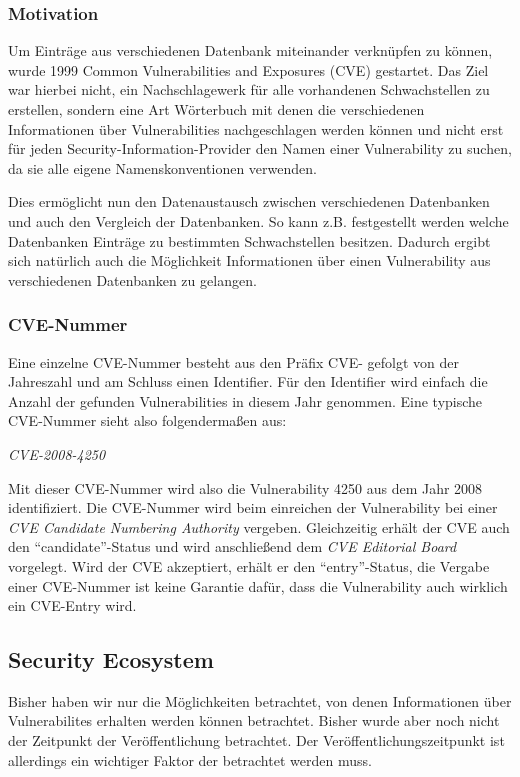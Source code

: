 \subsubsection{Motivation} Um Einträge aus verschiedenen Datenbank
miteinander verknüpfen zu können, wurde 1999 Common Vulnerabilities
and Exposures (CVE) gestartet. Das Ziel war hierbei nicht, ein
Nachschlagewerk für alle vorhandenen Schwachstellen zu erstellen,
sondern eine Art Wörterbuch mit denen die verschiedenen Informationen
über Vulnerabilities nachgeschlagen werden können und nicht erst für
jeden Security-Information-Provider den Namen einer Vulnerability zu
suchen, da sie alle eigene Namenskonventionen verwenden.

Dies ermöglicht nun den Datenaustausch zwischen verschiedenen
Datenbanken und auch den Vergleich der Datenbanken. So kann
z.B. festgestellt werden welche Datenbanken Einträge zu bestimmten
Schwachstellen besitzen. Dadurch ergibt sich natürlich auch die
Möglichkeit Informationen über einen Vulnerability aus verschiedenen
Datenbanken zu gelangen.
\subsubsection{CVE-Nummer} Eine einzelne CVE-Nummer besteht aus den
Präfix CVE- gefolgt von der Jahreszahl und am Schluss einen
Identifier. Für den Identifier wird einfach die Anzahl der gefunden
Vulnerabilities in diesem Jahr genommen. Eine typische CVE-Nummer
sieht also folgendermaßen aus:\\
\begin{center} \textit{CVE-2008-4250}
\end{center} Mit dieser CVE-Nummer wird also die Vulnerability 4250
aus dem Jahr 2008 identifiziert.  Die CVE-Nummer wird beim einreichen
der Vulnerability bei einer \textit{CVE Candidate Numbering Authority}
vergeben. Gleichzeitig erhält der CVE auch den
\enquote{candidate}-Status und wird anschließend dem \textit{CVE
Editorial Board} vorgelegt. Wird der CVE akzeptiert, erhält er den
\enquote{entry}-Status, die Vergabe einer CVE-Nummer ist keine
Garantie dafür, dass die Vulnerability auch wirklich ein CVE-Entry
wird.
\subsection{Security Ecosystem}

Bisher haben wir nur die Möglichkeiten betrachtet, von denen
Informationen über Vulnerabilites erhalten werden können
betrachtet. Bisher wurde aber noch nicht der Zeitpunkt der
Veröffentlichung betrachtet. Der Veröffentlichungszeitpunkt ist
allerdings ein wichtiger Faktor der betrachtet werden muss.

